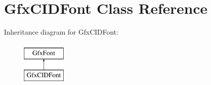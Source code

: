 \hypertarget{class_gfx_c_i_d_font}{}\section{Gfx\+C\+I\+D\+Font Class Reference}
\label{class_gfx_c_i_d_font}
Inheritance diagram for Gfx\+C\+I\+D\+Font\+:\begin{figure}[H]
\begin{center}
\leavevmode
\includegraphics[height=2.000000cm]{class_gfx_c_i_d_font}
\end{center}
\end{figure}
